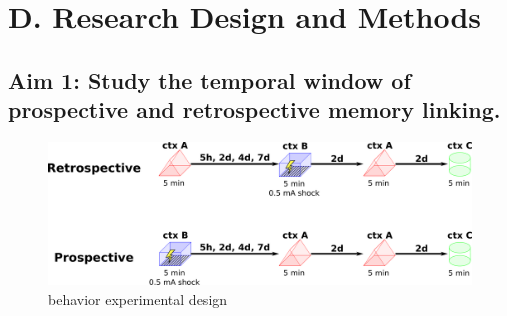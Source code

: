 \documentclass[master.tex]{subfiles}
\begin{document}
\section*{D. Research Design and Methods}

\subsection*{Aim 1: Study the temporal window of prospective and retrospective
  memory linking.}

\begin{figure}[!hbt]
  \centering \includegraphics[scale = .135]{Figures/exp_pro_retro.pdf}
  \caption{\footnotesize behavior experimental design}
  \label{fig:exp_behav}
\end{figure}
\end{document}
